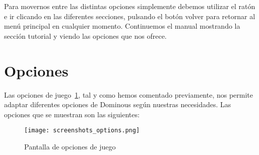 Para movernos entre las distintas opciones simplemente debemos utilizar el ratón e ir clicando en las diferentes secciones,
pulsando el botón volver para retornar al menú principal en cualquier momento. Continuemos el manual mostrando la sección
tutorial y viendo las opciones que nos ofrece.


\section{Opciones}

Las opciones de juego~\ref{fig:screenshots_options}, tal y como hemos comentado previamente, nos permite adaptar diferentes opciones de Dominous según
nuestras necesidades. Las opciones que se muestran son las siguientes:

\begin{figure}[h]
  \label{fig:screenshots_options}
  \begin{center}
    \texttt{[image: screenshots\_options.png]}
  \end{center}
  \caption{Pantalla de opciones de juego}
\end{figure}

